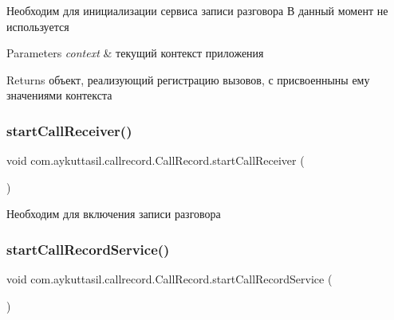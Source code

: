 Необходим для инициализации сервиса записи разговора В данный момент не используется 
\begin{DoxyParams}{Parameters}
{\em context} & текущий контекст приложения \\
\hline
\end{DoxyParams}
\begin{DoxyReturn}{Returns}
объект, реализующий регистрацию вызовов, с присвоенныны ему значениями контекста 
\end{DoxyReturn}
\mbox{\label{classcom_1_1aykuttasil_1_1callrecord_1_1_call_record_ab7603981df60fd6c66fdc8692ca08ee6}} 
\subsubsection{\texorpdfstring{start\+Call\+Receiver()}{startCallReceiver()}}
{\footnotesize\ttfamily void com.\+aykuttasil.\+callrecord.\+Call\+Record.\+start\+Call\+Receiver (\begin{DoxyParamCaption}{ }\end{DoxyParamCaption})}

Необходим для включения записи разговора \mbox{\label{classcom_1_1aykuttasil_1_1callrecord_1_1_call_record_a1d82c1d77cf1bec400c1e281b8730075}} 
\subsubsection{\texorpdfstring{start\+Call\+Record\+Service()}{startCallRecordService()}}
{\footnotesize\ttfamily void com.\+aykuttasil.\+callrecord.\+Call\+Record.\+start\+Call\+Record\+Service (\begin{DoxyParamCaption}{ }\end{DoxyParamCaption})}

